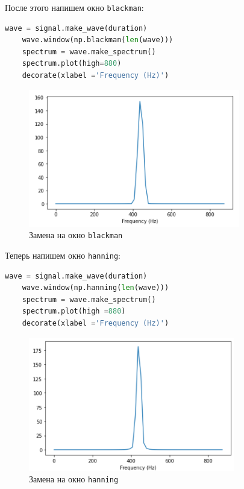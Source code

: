 \documentclass[a4paper]{article}
\begin{document}
            После этого напишем окно \texttt{blackman}:
            
\begin{lstlisting}[language=Python, caption= Окно \texttt{blackman}]
    wave = signal.make_wave(duration)
    wave.window(np.blackman(len(wave)))
    spectrum = wave.make_spectrum()
    spectrum.plot(high=880)
    decorate(xlabel ='Frequency (Hz)')
\end{lstlisting}               
            
            \begin{figure}[H]
                \centering
                \includegraphics{ex_1_blackman.png}
                \caption{Замена на окно \texttt{blackman}}
                \label{fig:ex_1_blackman}
            \end{figure}
            
            Теперь напишем окно \texttt{hanning}:
            
\begin{lstlisting}[language=Python, caption= Окно \texttt{hanning}]
    wave = signal.make_wave(duration)
    wave.window(np.hanning(len(wave)))
    spectrum = wave.make_spectrum()
    spectrum.plot(high =880)
    decorate(xlabel ='Frequency (Hz)')
\end{lstlisting}               
            
            \begin{figure}[H]
                \centering
                \includegraphics{ex_1_hanning.png}
                \caption{Замена на окно \texttt{hanning}}
                \label{fig:ex_1_blackman}
            \end{figure}
            
\end{document}
